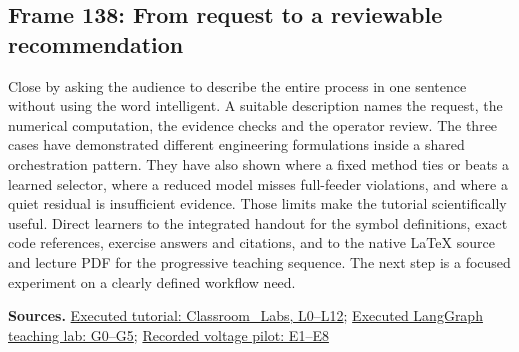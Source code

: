 \documentclass[11pt]{article}
\begin{document}
\subsection*{Frame 138: From request to a reviewable recommendation}
Close by asking the audience to describe the entire process in one sentence without using the word intelligent. A suitable description names the request, the numerical computation, the evidence checks and the operator review. The three cases have demonstrated different engineering formulations inside a shared orchestration pattern. They have also shown where a fixed method ties or beats a learned selector, where a reduced model misses full-feeder violations, and where a quiet residual is insufficient evidence. Those limits make the tutorial scientifically useful. Direct learners to the integrated handout for the symbol definitions, exact code references, exercise answers and citations, and to the native LaTeX source and lecture PDF for the progressive teaching sequence. The next step is a focused experiment on a clearly defined workflow need.\par
\par\nopagebreak\begin{minipage}{\linewidth}{\footnotesize\color{slate}\textbf{Sources.} \href{../Classroom_Labs.html}{Executed tutorial: Classroom\_Labs, L0--L12}; \href{../Graph_Workflow_Lab.html}{Executed LangGraph teaching lab: G0--G5}; \href{../LLM_Response_Selection.html}{Recorded voltage pilot: E1--E8}\par}\end{minipage}\par\medskip
\end{document}

